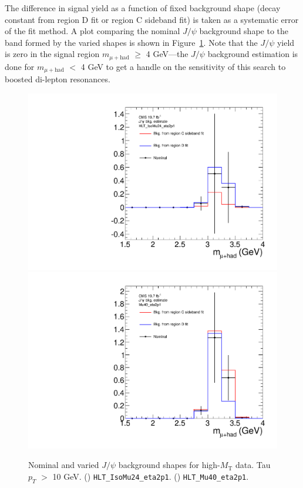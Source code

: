 The difference in signal yield as a function of fixed background shape (decay constant from region D fit or region C sideband fit) is taken as a systematic error of the fit method.  A plot comparing the nominal $J\slash\psi$ background shape to the band formed by the varied shapes is shown in Figure~\ref{fig:res-bkg-syst}.  Note that the $J\slash\psi$ yield is zero in the signal region $m_{\mu+\text{had}}$ $\geq$ 4 GeV---the $J\slash\psi$ background estimation is done for $m_{\mu+\text{had}}$ $<$ 4 GeV to get a handle on the sensitivity of this search to boosted di-lepton resonances.

\begin{figure}[hbtp]
  \begin{center}
    \includegraphics[width=\cmsFigWidth]{figures/resBkgSystCanvas_HLT_IsoMu24_eta2p1}
    \includegraphics[width=\cmsFigWidth]{figures/resBkgSystCanvas_Mu40_eta2p1}
    \caption{Nominal and varied $J\slash\psi$ background shapes for high-$M_{\text{T}}$ data.  Tau $p_T$ $>$ 10 GeV.  (\cmsLeft) \texttt{HLT\_IsoMu24\_eta2p1}.  (\cmsRight) \texttt{HLT\_Mu40\_eta2p1}.}
    \label{fig:res-bkg-syst}
  \end{center}
\end{figure}

